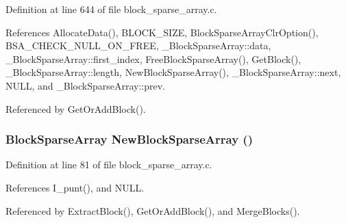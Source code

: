 Definition at line 644 of file block\_\-sparse\_\-array.c.

References Allocate\-Data(), BLOCK\_\-SIZE, Block\-Sparse\-Array\-Clr\-Option(), BSA\_\-CHECK\_\-NULL\_\-ON\_\-FREE, \_\-Block\-Sparse\-Array::data, \_\-Block\-Sparse\-Array::first\_\-index, Free\-Block\-Sparse\-Array(), Get\-Block(), \_\-Block\-Sparse\-Array::length, New\-Block\-Sparse\-Array(), \_\-Block\-Sparse\-Array::next, NULL, and \_\-Block\-Sparse\-Array::prev.

Referenced by Get\-Or\-Add\-Block().
\subsubsection{\setlength{\rightskip}{0pt plus 5cm}\bf{Block\-Sparse\-Array} New\-Block\-Sparse\-Array ()}\label{block__sparse__array_8c_4070ef3b8cd4519b49811f88002197a5}




Definition at line 81 of file block\_\-sparse\_\-array.c.

References I\_\-punt(), and NULL.

Referenced by Extract\-Block(), Get\-Or\-Add\-Block(), and Merge\-Blocks().